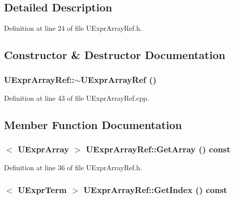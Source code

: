 \subsection{Detailed Description}


Definition at line 24 of file UExprArrayRef.h.

\subsection{Constructor \& Destructor Documentation}
\hypertarget{class_u_expr_array_ref_b550b66b0f55a17607edbea276e8ad65}{
\subsubsection[{$\sim$UExprArrayRef}]{\setlength{\rightskip}{0pt plus 5cm}UExprArrayRef::$\sim$UExprArrayRef ()}}
\label{class_u_expr_array_ref_b550b66b0f55a17607edbea276e8ad65}




Definition at line 43 of file UExprArrayRef.cpp.

\subsection{Member Function Documentation}
\hypertarget{class_u_expr_array_ref_8dbefb61e16ddb9f48e2168260a6b502}{
\subsubsection[{GetArray}]{$<$ {\bf UExprArray} $>$ UExprArrayRef::GetArray () const}}
\label{class_u_expr_array_ref_8dbefb61e16ddb9f48e2168260a6b502}




Definition at line 36 of file UExprArrayRef.h.\hypertarget{class_u_expr_array_ref_0e539f170c37f1c49c8c35bb01bbdb22}{
\subsubsection[{GetIndex}]{$<$ {\bf UExprTerm} $>$ UExprArrayRef::GetIndex () const}}
\label{class_u_expr_array_ref_0e539f170c37f1c49c8c35bb01bbdb22}




